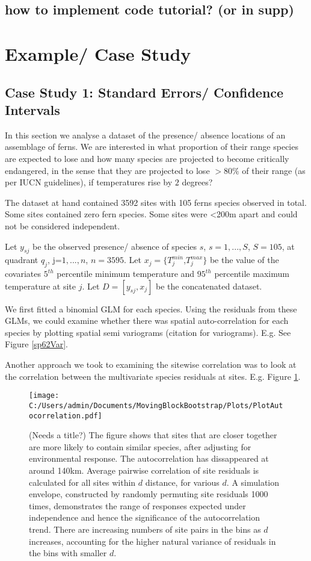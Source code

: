 \documentclass[a4paper,12pt]{article}
\begin{document}
\subsection{how to implement code tutorial? (or in supp)}
\section{Example/ Case Study}
\subsection{Case Study 1: Standard Errors/ Confidence Intervals}


In this section we analyse a dataset of the presence/ absence locations of an assemblage of ferns. We are interested in what proportion of their range species are expected to lose and how many species are projected to become critically endangered, in the sense that they are projected to lose $>80\%$ of their range (as per IUCN guidelines), if temperatures rise by $2$ degrees? 

The dataset at hand contained 3592 sites with 105 ferns species observed in total. Some sites contained zero fern species. Some sites were <200m apart and could not be considered independent. 

Let $y_{sj}$ be the observed presence/ absence of species $s$, $s=1,...,S$, $S=105$, at quadrant $q_j$, j=$1,...,n$, $n=3595$. Let $x_j=\{T^{min}_j$,$T^{max}_j\}$ be the value of the covariates $5^{th}$ percentile minimum temperature and $95^{th}$ percentile maximum temperature at site $j$. Let $D=[y_{sj},x_j]$ be the concatenated dataset. 


We first fitted a binomial GLM for each species. Using the residuals from these GLMs, we could examine whether there was spatial auto-correlation for each species by plotting spatial semi variograms (citation for variograms). E.g. See Figure \ref{sp62Var}. 

Another approach we took to examining the sitewise correlation was to look at the correlation between the multivariate species residuals at sites. E.g. Figure \ref{sitewise}.

\begin{figure}
\label{sitewise}
\texttt{[image: C:/Users/admin/Documents/MovingBlockBootstrap/Plots/PlotAutocorrelation.pdf]}
\caption{ (Needs a title?) The figure shows that sites that are closer together are more likely to contain similar species, after adjusting for environmental response. The autocorrelation has dissappeared at around 140km. Average pairwise correlation of site residuals is calculated for all sites within $d$ distance, for various $d$. A simulation envelope, constructed by randomly permuting site residuals 1000 times, demonstrates the range of responses expected under independence and hence the significance of the autocorrelation trend. There are increasing numbers of site pairs in the bins as $d$ increases, accounting for the higher natural variance of residuals in the bins with smaller $d$.}
\end{figure}
\end{document}
